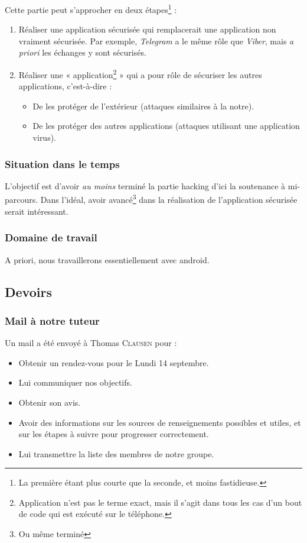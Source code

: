 \documentclass[a4paper, 11pt]{article}
\begin{document}
Cette partie peut s'approcher en deux étapes\footnote{La première étant plus courte que la seconde, et moins fastidieuse.} :
\begin{enumerate}
	\item Réaliser une application sécurisée qui remplacerait une application non vraiment sécurisée. Par exemple, \emph{Telegram} a le même rôle que \emph{Viber}, mais \emph{a priori} les échanges y sont sécurisés.
	\item Réaliser une « application\footnote{Application n'est pas le terme exact, mais il s'agit dans tous les cas d'un bout de code qui est exécuté sur le téléphone.} » qui a pour rôle de sécuriser les autres applications, c'est-à-dire :
	\begin{itemize}
		\item De les protéger de l'extérieur (attaques similaires à la notre).
		\item De les protéger des autres applications (attaques utilisant une application virus).
	\end{itemize}
\end{enumerate} 

\subsubsection{Situation dans le temps}

L'objectif est d'avoir \emph{au moins} terminé la partie hacking d'ici la soutenance à mi-parcours. Dans l'idéal, avoir avancé\footnote{Ou même terminé} dans la réalisation de l'application sécurisée serait intéressant.

\subsubsection{Domaine de travail}

A priori, nous travaillerons essentiellement avec android.

\subsection{Devoirs}

\subsubsection{Mail à notre tuteur}
Un mail a été envoyé à Thomas \textsc{Clausen} pour :
\begin{itemize}
	\item Obtenir un rendez-vous pour le Lundi 14 septembre.
	\item Lui communiquer nos objectifs.
	\item Obtenir son avis.
	\item Avoir des informations sur les sources de renseignements possibles et utiles, et sur les étapes à suivre pour progresser correctement.
	\item Lui transmettre la liste des membres de notre groupe.
\end{itemize}
\end{document}
